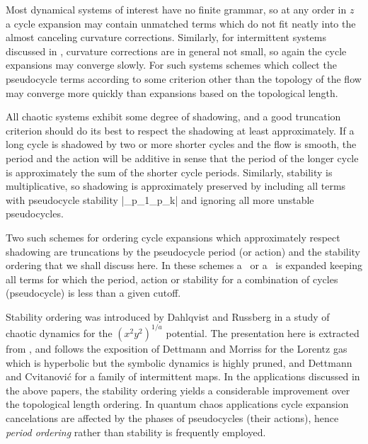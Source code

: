\renewcommand{\inputfile}{\version\ - edited 2008-06-26 stabOrder}


\noindent
{}
Most dynamical systems of interest have no finite grammar, so
at any order in $z$ a cycle
expansion may contain unmatched terms which do
not fit neatly into the almost canceling curvature corrections.
Similarly, for intermittent systems discussed
in \wwwcb,
curvature corrections are in general not small, so again the
cycle expansions may converge slowly.  For such systems
schemes which
collect the
pseudo\-cycle terms according to some criterion other
than the topology of the flow may converge
more quickly than expansions based on the topological length.

All chaotic systems exhibit some degree of shadowing, and a
good truncation criterion should do its best to respect the shadowing
at least approximately.
If a long cycle is
shadowed by two or more shorter cycles and the flow is smooth, the period
and the action will be additive in sense that the period of the longer cycle is
approximately the sum of the shorter cycle periods.  Similarly,
stability is multiplicative, so shadowing is approximately preserved
by including all terms with pseudocycle stability
\beq
\left|\ExpaEig_{p_1}\cdots\ExpaEig_{p_k}\right| \leq \stabCutoff
{}
and ignoring all more unstable pseudocycles.

Two such schemes for ordering cycle expansions which
approximately respect shadowing are truncations
by the pseudo\-cycle period (or action)
and the stability ordering
that we shall discuss here.  In these schemes a \dzeta\ or a
\fd\ is expanded keeping all terms for which the period, action or stability
for a combination of cycles (pseudocycle) is less than a given cutoff.


Stability ordering was introduced by
Dahlqvist and Russberg in a study of chaotic dynamics for the
$(x^2y^2)^{1/a}$ potential.
The presentation here is extracted from \wwwcb, and
follows the exposition of
Dettmann and Morriss for the Lorentz gas
which is hyperbolic but the symbolic dynamics is highly pruned, and
Dettmann and Cvitanovi\'c for a family of intermittent maps.
In
the
applications discussed in the above papers, the stability ordering
yields a considerable improvement over the topological length
ordering. In quantum chaos applications cycle expansion cancelations
are affected by the phases of pseudocycles (their actions), hence
{\em period ordering} rather than stability is frequently employed.

